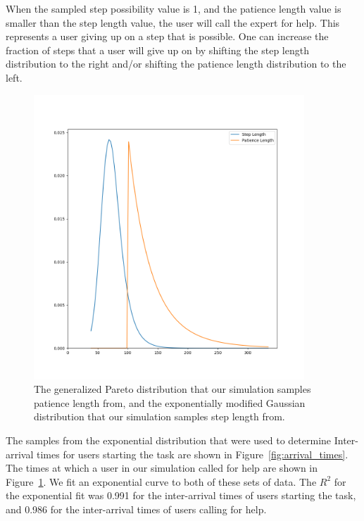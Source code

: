 When the sampled step possibility value is 1, and the patience length value is
smaller than the step length value, the user will call the expert for help.
This represents a user giving up on a step that is possible.
One can increase the fraction of steps that a user will give up on by shifting
the step length distribution to the right and/or shifting the patience length
distribution to the left.

\begin{figure}[h]
  \includegraphics[width=4in]{figures/montecarlo/step_patience.png}
  \caption{
    The generalized Pareto distribution that our simulation samples patience
    length from, and the exponentially modified Gaussian distribution that our
    simulation samples step length from.
  }\label{fig:step_patience}
\end{figure}

The samples from the exponential distribution that were used to determine
Inter-arrival times for users starting the task are shown in
Figure~\ref{fig:arrival_times}.
The times at which a user in our simulation called for help are shown in
Figure~\ref{fig:step_patience}.
We fit an exponential curve to both of these sets of data.
The $R^2$ for the exponential fit was 0.991 for the inter-arrival times of users
starting the task, and 0.986 for the inter-arrival times of users calling for
help.

